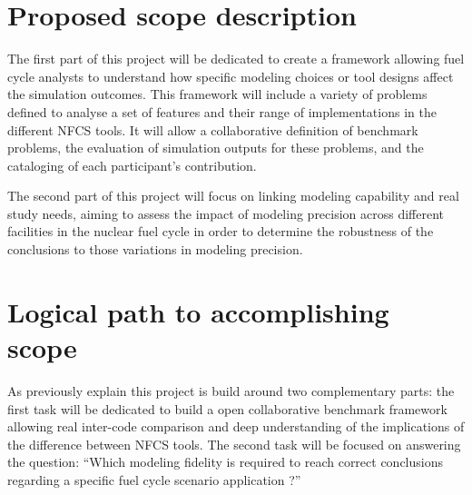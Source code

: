 \section{Proposed scope description}


The first part of this project will be dedicated to create a framework allowing
fuel cycle analysts to understand how specific modeling choices or tool designs
affect the simulation outcomes. This framework will include a variety of
problems defined to analyse a set of features and their range of implementations
in the different NFCS tools. It will allow a collaborative definition of
benchmark problems, the evaluation of simulation outputs for these problems, and
the cataloging of each participant’s contribution.

The second part of this project will focus on linking modeling capability and
real study needs, aiming to assess the impact of modeling precision across
different facilities in the nuclear fuel cycle in order to determine the
robustness of the conclusions to those variations in modeling precision.



\section{Logical path to accomplishing scope}

As previously explain this project is build around two complementary parts: the
first task will be dedicated to build a open collaborative benchmark framework
allowing real inter-code comparison and deep understanding of the implications
of the difference between NFCS tools. The second task will be focused on
answering the question: ``Which modeling fidelity is required to reach correct
conclusions regarding a specific fuel cycle scenario application ?''


